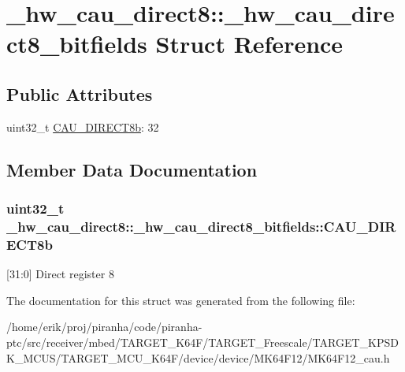 \hypertarget{struct__hw__cau__direct8_1_1__hw__cau__direct8__bitfields}{}\section{\+\_\+hw\+\_\+cau\+\_\+direct8\+:\+:\+\_\+hw\+\_\+cau\+\_\+direct8\+\_\+bitfields Struct Reference}
\label{struct__hw__cau__direct8_1_1__hw__cau__direct8__bitfields}
\subsection*{Public Attributes}
\begin{DoxyCompactItemize}
\item 
uint32\+\_\+t \hyperlink{struct__hw__cau__direct8_1_1__hw__cau__direct8__bitfields_a28573a44481692c403444c25cd0faeaa}{C\+A\+U\+\_\+\+D\+I\+R\+E\+C\+T8b}\+: 32
\end{DoxyCompactItemize}


\subsection{Member Data Documentation}
\subsubsection[{\texorpdfstring{C\+A\+U\+\_\+\+D\+I\+R\+E\+C\+T8b}{CAU_DIRECT8b}}]{\setlength{\rightskip}{0pt plus 5cm}uint32\+\_\+t \+\_\+hw\+\_\+cau\+\_\+direct8\+::\+\_\+hw\+\_\+cau\+\_\+direct8\+\_\+bitfields\+::\+C\+A\+U\+\_\+\+D\+I\+R\+E\+C\+T8b}\hypertarget{struct__hw__cau__direct8_1_1__hw__cau__direct8__bitfields_a28573a44481692c403444c25cd0faeaa}{}\label{struct__hw__cau__direct8_1_1__hw__cau__direct8__bitfields_a28573a44481692c403444c25cd0faeaa}
\mbox{[}31\+:0\mbox{]} Direct register 8 

The documentation for this struct was generated from the following file\+:\begin{DoxyCompactItemize}
\item 
/home/erik/proj/piranha/code/piranha-\/ptc/src/receiver/mbed/\+T\+A\+R\+G\+E\+T\+\_\+\+K64\+F/\+T\+A\+R\+G\+E\+T\+\_\+\+Freescale/\+T\+A\+R\+G\+E\+T\+\_\+\+K\+P\+S\+D\+K\+\_\+\+M\+C\+U\+S/\+T\+A\+R\+G\+E\+T\+\_\+\+M\+C\+U\+\_\+\+K64\+F/device/device/\+M\+K64\+F12/M\+K64\+F12\+\_\+cau.\+h\end{DoxyCompactItemize}
